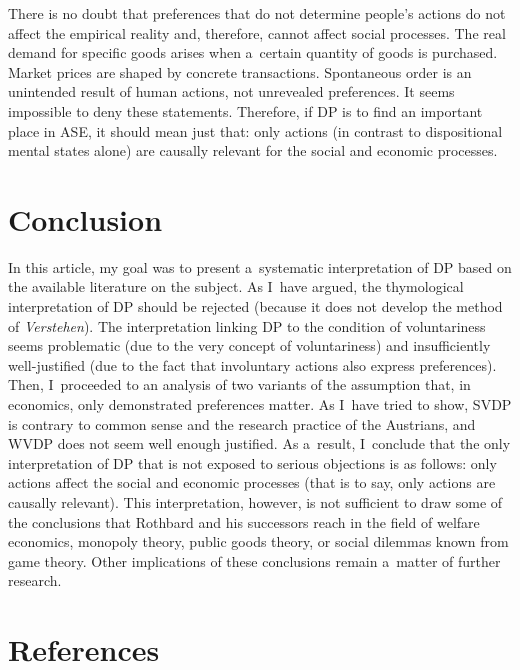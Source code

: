 There is no doubt that preferences that do not determine people's actions do not affect the empirical reality and, therefore, cannot affect social processes. The real demand for specific goods arises when a~certain quantity of goods is purchased. Market prices are shaped by concrete transactions. Spontaneous order is an unintended result of human actions, not unrevealed preferences. It seems impossible to deny these statements. Therefore, if DP is to find an important place in ASE, it should mean just that: only actions (in contrast to dispositional mental states alone) are causally relevant for the social and economic processes.



\section{Conclusion}

In this article, my goal was to present a~systematic interpretation of DP based on the available literature on the subject. As I~have argued, the thymological interpretation of DP should be rejected (because it does not develop the method of \textit{Verstehen}). The interpretation linking DP to the condition of voluntariness seems problematic (due to the very concept of voluntariness) and insufficiently well-justified (due to the fact that involuntary actions also express preferences). Then, I~proceeded to an analysis of two variants of the assumption that, in economics, only demonstrated preferences matter. As I~have tried to show, SVDP is contrary to common sense and the research practice of the Austrians, and WVDP does not seem well enough justified. As a~result, I~conclude that the only interpretation of DP that is not exposed to serious objections is as follows: only actions affect the social and economic processes (that is to say, only actions are causally relevant). This interpretation, however, is not sufficient to draw some of the conclusions that Rothbard and his successors reach in the field of welfare economics, monopoly theory, public goods theory, or social dilemmas known from game theory. Other implications of these conclusions remain a~matter of further research.



\section{References}



